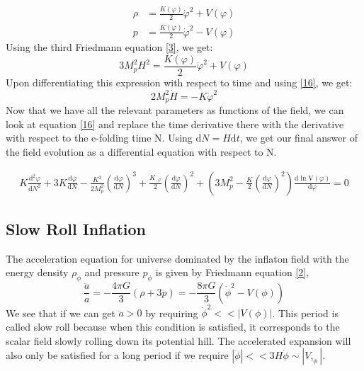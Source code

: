 \documentclass[aps,prd,reprint,preprintnumbers,showpacs,floatfix,nofootinbib,superscript address]{revtex4-2}
\begin{document}
\begin{align}
    \rho &= \frac{K(\varphi)}{2} \dot{\varphi}^2 + V(\varphi) \nonumber \\
    p &= \frac{K(\varphi)}{2} \dot{\varphi}^2 - V(\varphi)
\end{align}
Using the third Friedmann equation \ref{3}, we get:
\begin{equation}    \label{Friedmann Eqn 2}
    3 M_p^2H^2 = \frac{K(\varphi)}{2} \dot{\varphi}^2 + V(\varphi)
\end{equation}
Upon differentiating this expression with respect to time and using \ref{16}, we get:
\begin{equation}
    2 M_p^2 \dot{H} = -  K \dot{\varphi}^2
\end{equation}
Now that we have all the relevant parameters as functions of the field, we can look at equation \ref{16} and replace the time derivative there with the derivative with respect to the e-folding time N. Using $\text{d}N = H \text{d}t$, we get our final answer of the field evolution as a differential equation with respect to N.
\begin{widetext}
\begin{subequations}
\begin{align}\label{21}
    K\frac{\text{d}^2\varphi}{\text{d}N^2} +3 K \frac{\text{d}\varphi}{\text{d}N}  - \frac{K^2}{2M_p^2} \left(\frac{\text{d}\varphi}{\text{d}N} \right)^3  +  \frac{K_{,\varphi}}{2}  \left(\frac{\text{d}\varphi}{\text{d}N} \right)^2 +  \left( 3 M_p^2 - \frac{K}{2} \left(\frac{\text{d}\varphi}{\text{d}N} \right)^2 \right) \frac{\text{d}\ln \text{V}(\varphi)}{\text{d} \varphi} = 0    
\end{align}
\end{subequations}
\end{widetext}
\subsection{Slow Roll Inflation}
The acceleration equation for universe dominated by the inflaton field with the energy density $\rho_{\phi}$ and pressure $p_{\phi}$ is given by Friedmann equation \ref{2},
\begin{equation}
    \frac{\ddot{a}}{a} = -\frac{4\pi G}{3} (\rho +3p) = -\frac{8\pi G}{3} ({\dot{\phi}}^2 - V(\phi)) 
\end{equation}
We see that if we can get $\ddot{a} > 0$ by requiring $\dot{\phi}^2 << |V(\phi)|$. This period is called slow roll because when this condition is satisfied, it corresponds to the scalar field slowly rolling down its potential hill. The accelerated expansion will also only be satisfied for a long period if we require $|\ddot{\phi}| << 3H\dot{\phi} \sim |V,_{\phi}|$. 
\end{document}
